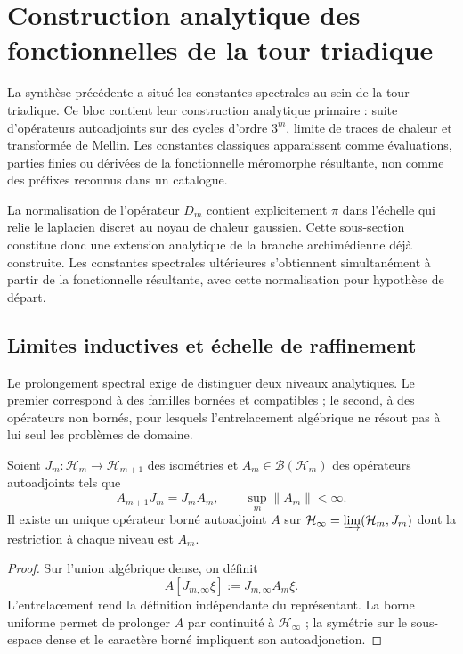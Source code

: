 \chapter{Construction analytique des fonctionnelles de la tour triadique}
\label{chap:funcionales-espectrales-triadicos}

La synthèse précédente a situé les constantes spectrales au sein de la
tour triadique. Ce bloc contient leur construction analytique primaire :
suite d'opérateurs autoadjoints sur des cycles d'ordre \(3^m\), limite de
traces de chaleur et transformée de Mellin. Les constantes classiques apparaissent
comme évaluations, parties finies ou dérivées de la fonctionnelle méromorphe
résultante, non comme des préfixes reconnus dans un catalogue.

La normalisation de l'opérateur $D_m$ contient explicitement $\pi$ dans l'échelle
qui relie le laplacien discret au noyau de chaleur gaussien. Cette
sous-section constitue donc une extension analytique de la branche
archimédienne déjà construite. Les constantes spectrales ultérieures s'obtiennent
simultanément à partir de la fonctionnelle résultante, avec cette normalisation pour hypothèse
de départ.

\section{Limites inductives et échelle de raffinement}

Le prolongement spectral exige de distinguer deux niveaux analytiques. Le
premier correspond à des familles bornées et compatibles ; le second, à des
opérateurs non bornés, pour lesquels l'entrelacement algébrique ne
résout pas à lui seul les problèmes de domaine.

\begin{theorem}
\label{pf84:E03-06}
Soient \(J_m:\mathcal H_m\to\mathcal H_{m+1}\) des isométries et
\(A_m\in\mathcal B(\mathcal H_m)\) des opérateurs autoadjoints tels que
\[
 A_{m+1}J_m=J_mA_m,
 \qquad
 \sup_m\lVert A_m\rVert<\infty.
\]
Il existe un unique opérateur borné autoadjoint \(A\) sur
\(\mathcal H_\infty=\varinjlim(\mathcal H_m,J_m)\) dont la restriction à chaque
niveau est \(A_m\).
\end{theorem}

\begin{proof}
Sur l'union algébrique dense, on définit
\[
 A[J_{m,\infty}\xi]:=J_{m,\infty}A_m\xi.
\]
L'entrelacement rend la définition indépendante du représentant. La
borne uniforme permet de prolonger \(A\) par continuité à
\(\mathcal H_\infty\) ; la symétrie sur le sous-espace dense et le caractère borné
impliquent son autoadjonction.
\end{proof}

